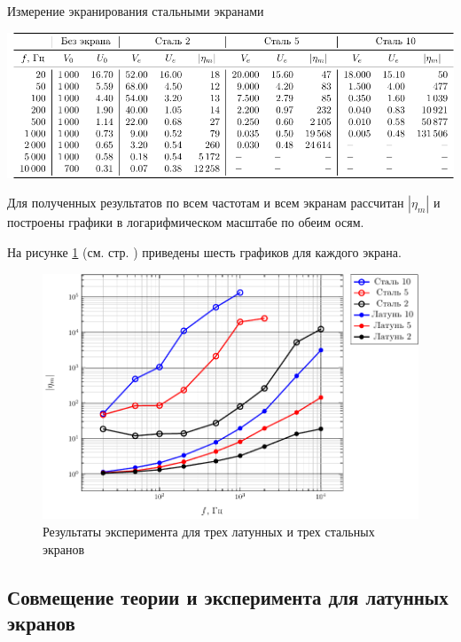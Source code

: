 \begin{table}[h!]
	\caption{Измерение экранирования стальными экранами}
	\label{tab:6s1}
	\vspace{1em}
	\centering
	\includegraphics[width=\textwidth]{tables/table2}
\end{table}

Для полученных результатов по всем частотам и всем экранам рассчитан $|\eta_m|$ и построены графики в логарифмическом масштабе по обеим осям.

На рисунке \ref{fig:all} (см. стр. \pageref{fig:all}) приведены шесть графиков для каждого экрана. 

\begin{figure}[H]
	\centering
	\includegraphics[scale=1]{imgs/graphs/eta}
	\caption{Результаты эксперимента для трех латунных и трех стальных экранов}
	\label{fig:all}
\end{figure}

\subsection{Совмещение теории и эксперимента для латунных экранов}


